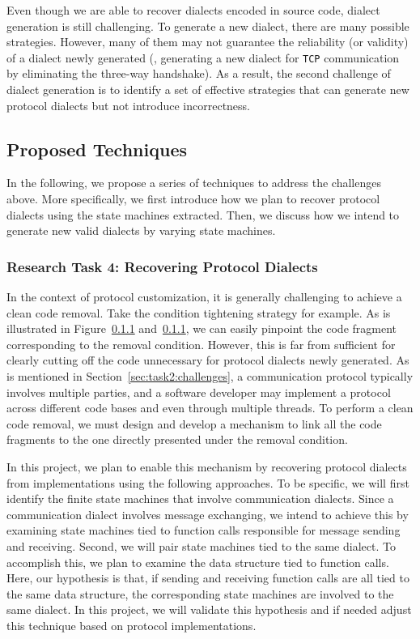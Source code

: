   Even though we are able to
recover dialects encoded in source code, dialect generation is still
challenging. To generate a new dialect, there are many possible strategies.
However, many of them may not guarantee the reliability (or validity) of a
dialect newly generated (\eg, generating a new dialect for \texttt{TCP}
communication by eliminating the three-way handshake). As a result, the second
challenge of dialect generation is to identify a set of effective strategies
that can generate new protocol dialects but not introduce incorrectness.

\subsection{Proposed Techniques}

In the following, we propose a series of techniques to address the challenges above. More specifically, we first introduce how we plan to recover protocol dialects using the state machines extracted. Then, we discuss how we intend to generate new valid dialects by varying state machines. 

\subsubsection{Research Task 4: Recovering Protocol Dialects}

In the context of protocol customization, it is generally challenging to achieve a clean code removal. Take the condition tightening strategy for example. As is illustrated in Figure~\ref{} and~\ref{}, we can easily pinpoint the code fragment corresponding to the removal condition. However, this is far from sufficient for clearly cutting off the code unnecessary for protocol dialects newly generated. As is mentioned in Section~\ref{sec:task2:challenges}, a communication protocol typically involves multiple parties, and a software developer may implement a protocol across different code bases and even through multiple threads. To perform a clean code removal, we must design and develop a mechanism to link all the code fragments to the one directly presented under the removal condition.  

In this project, we plan to enable this mechanism by recovering protocol dialects from implementations using the following approaches. To be specific, we will first identify the finite state machines that involve communication dialects. Since a communication dialect involves message exchanging, we intend to achieve this by examining state machines tied to function calls responsible for message sending and receiving. Second, we will pair state machines tied to the same dialect. To accomplish this, we plan to examine the data structure tied to function calls. Here, our hypothesis is that, if sending and receiving function calls are all tied to the same data structure, the corresponding state machines are involved to the same dialect. In this project, we will validate this hypothesis and if needed adjust this technique based on protocol implementations. 

